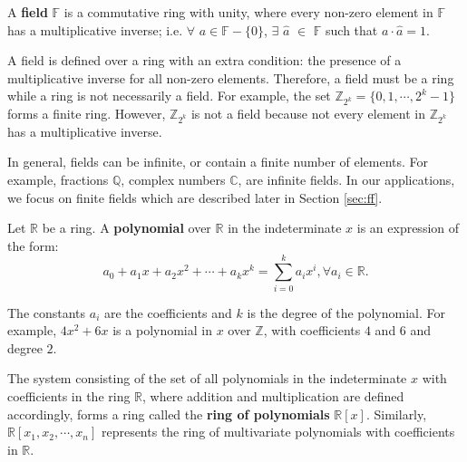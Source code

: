 \begin{Definition}
A {\bf field} $\mathbb{F}$ is a commutative ring with unity, where every
non-zero element in $\mathbb{F}$ has a multiplicative inverse; i.e. $\forall$
$a \in \mathbb{F} - \{0\}$, $\exists$ $\hat{a}$ $\in$ $\mathbb{F}$ such that $ a \cdot
\hat{a} = 1$.
\end{Definition}

A field is defined over a ring with an extra condition: the presence of a multiplicative inverse for all non-zero elements.
Therefore, a field must be a ring while a ring is not necessarily a field.
For example, the set $\mathbb{Z}_{2^k} = \{0,1,\cdots, 2^k-1\}$ forms a finite ring.
However, $\mathbb{Z}_{2^k}$ is not a field because not every element in
$\mathbb{Z}_{2^k}$ has a multiplicative inverse. 

In general, fields can be infinite, or contain a finite number of elements. 
For example, fractions $\mathbb{Q}$, complex numbers $\mathbb{C}$, are infinite fields.
In our applications, we focus on finite fields which are described later in Section \ref{sec:ff}.


\begin{Definition}\label{def:poly}
Let $\mathbb{R}$ be a ring. A {\bf polynomial} over $\mathbb{R}$ in the indeterminate $x$ is
an expression of the form:
\begin{equation} \label{eq:poly1}
a_0 + a_1 x + a_2 x^2 + \cdots + a_k x^k = \sum_{i=0}^{k} a_i x^i, \forall a_i \in \mathbb{R}. 
\end{equation}

\end{Definition} 

The constants $a_i$ are the coefficients and $k$ is the degree of the polynomial. 
For example, $4x^2 + 6x$ is a polynomial in $x$ over $\mathbb{Z}$, with
coefficients $4$ and $6$ and degree $2$. 

\begin{Definition}
The system consisting of the set of all polynomials in the indeterminate
$x$ with coefficients in the ring $\mathbb{R}$, where addition and
multiplication are defined accordingly, forms a ring called the {\bf
ring of polynomials} $\mathbb{R}[x]$. Similarly, $\mathbb{R}[x_1,x_{2},\cdots, x_{n}]$ 
represents the ring of multivariate polynomials with coefficients in $\mathbb{R}$.
\end{Definition}

